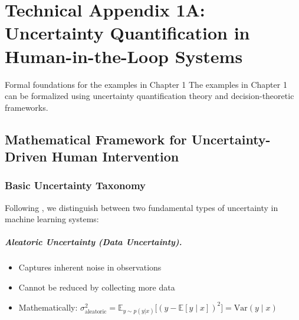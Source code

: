 
\chapter*{Technical Appendix 1A: Uncertainty Quantification in Human-in-the-Loop Systems}

\begin{chapterquote}{Formal foundations for the examples in Chapter 1}
The examples in Chapter 1 can be formalized using uncertainty quantification theory and decision-theoretic frameworks.
\end{chapterquote}

\apxnumon
\section{Mathematical Framework for Uncertainty-Driven Human Intervention}

\subsection{Basic Uncertainty Taxonomy}

Following \textcite{kendall2017uncertainties}, we distinguish between two fundamental types of uncertainty in machine learning systems:

\paragraph{Aleatoric Uncertainty (Data Uncertainty).}
\begin{itemize}
    \item Captures inherent noise in observations
    \item Cannot be reduced by collecting more data
    \item Mathematically: $\sigma^2_{\text{aleatoric}} = \mathbb{E}_{y \sim p(y|x)}\bigl[(y - \mathbb{E}[y \mid x])^2\bigr] = \mathrm{Var}(y \mid x)$
\end{itemize}

